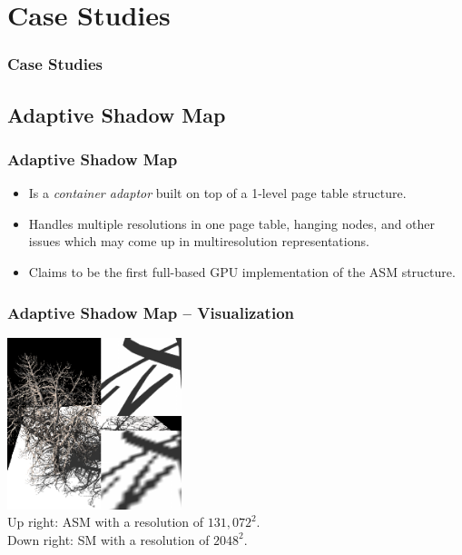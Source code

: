 \documentclass[xcolor={usenames,dvipsnames}]{beamer}
\begin{document}
\section{Case Studies}
\begin{frame}[fragile]
  \frametitle{Case Studies}


\end{frame}

\subsection{Adaptive Shadow Map}
\begin{frame}
  \frametitle{Adaptive Shadow Map}

  \begin{itemize}
  \item<2-> Is a \emph{container adaptor} built on top of a 1-level page table
    structure.
  \item<3-> Handles multiple resolutions in one page table, hanging nodes, and
    other issues which may come up in multiresolution representations.
  \item<4-> Claims to be the first full-based GPU implementation of the ASM
    structure.
  \end{itemize}
\end{frame}

\begin{frame}[t]
  \frametitle{Adaptive Shadow Map -- Visualization}
  \begin{center}
    \includegraphics[height=5cm]{img/asm} \\
    Up right: ASM with a resolution of $131,072^2$. \\
    Down right: SM with a resolution of $2048^2$.
  \end{center}
\end{frame}
\end{document}
